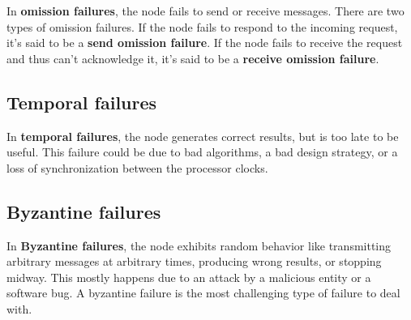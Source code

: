 In \textbf{omission failures}, the node fails to send or receive messages. There are two types of omission failures. If the node fails to respond to the incoming request, it's said to be a \textbf{send omission failure}. If the node fails to receive the request and thus can't acknowledge it, it's said to be a \textbf{receive omission failure}.

\subsection{Temporal failures}\label{IHgo0cFgs3kbRcqty6bj5}

In \textbf{temporal failures}, the node generates correct results, but is too late to be useful. This failure could be due to bad algorithms, a bad design strategy, or a loss of synchronization between the processor clocks.

\subsection{Byzantine failures}\label{8bMpZwdZHGAJVRMfiCtAH}

In \textbf{Byzantine failures}, the node exhibits random behavior like transmitting arbitrary messages at arbitrary times, producing wrong results, or stopping midway. This mostly happens due to an attack by a malicious entity or a software bug. A byzantine failure is the most challenging type of failure to deal with.


